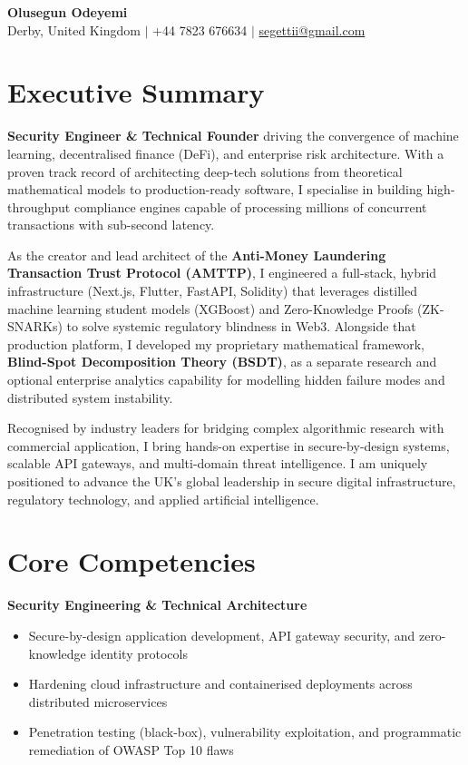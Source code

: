 \documentclass[11pt,a4paper]{article}
\begin{document}
\begin{center}
{\LARGE\bfseries Olusegun Odeyemi}\\[4pt]
Derby, United Kingdom \quad $\vert$ \quad +44 7823 676634 \quad $\vert$ \quad \href{mailto:segettii@gmail.com}{segettii@gmail.com}
\end{center}

\section*{Executive Summary}

\textbf{Security Engineer \& Technical Founder} driving the convergence of machine learning, decentralised finance (DeFi), and enterprise risk architecture. With a proven track record of architecting deep-tech solutions from theoretical mathematical models to production-ready software, I specialise in building high-throughput compliance engines capable of processing millions of concurrent transactions with sub-second latency.

As the creator and lead architect of the \textbf{Anti-Money Laundering Transaction Trust Protocol (AMTTP)}, I engineered a full-stack, hybrid infrastructure (Next.js, Flutter, FastAPI, Solidity) that leverages distilled machine learning student models (XGBoost) and Zero-Knowledge Proofs (ZK-SNARKs) to solve systemic regulatory blindness in Web3. Alongside that production platform, I developed my proprietary mathematical framework, \textbf{Blind-Spot Decomposition Theory (BSDT)}, as a separate research and optional enterprise analytics capability for modelling hidden failure modes and distributed system instability.

Recognised by industry leaders for bridging complex algorithmic research with commercial application, I bring hands-on expertise in secure-by-design systems, scalable API gateways, and multi-domain threat intelligence. I am uniquely positioned to advance the UK's global leadership in secure digital infrastructure, regulatory technology, and applied artificial intelligence.

\section*{Core Competencies}

\textbf{Security Engineering \& Technical Architecture}
\begin{itemize}
  \item Secure-by-design application development, API gateway security, and zero-knowledge identity protocols
  \item Hardening cloud infrastructure and containerised deployments across distributed microservices
  \item Penetration testing (black-box), vulnerability exploitation, and programmatic remediation of OWASP Top 10 flaws
\end{itemize}
\end{document}
